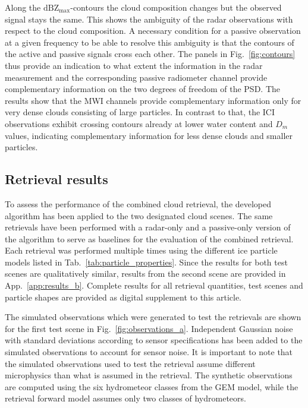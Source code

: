 \documentclass[journal abbreviation, manuscript]{copernicus}
\begin{document}
Along the $\text{dBZ}_\text{max}$-contours the cloud composition changes but the
observed signal stays the same. This shows the ambiguity of the radar
observations with respect to the cloud composition. A necessary condition for a
passive observation at a given frequency to be able to resolve this ambiguity is
that the contours of the active and passive signals cross each other. The panels
in Fig.~\ref{fig:contours} thus provide an indication to what extent the
information in the radar measurement and the corresponding passive radiometer
channel provide complementary information on the two degrees of freedom of the
PSD. The results show that the MWI channels provide complementary information
only for very dense clouds consisting of large particles. In contrast to that,
the ICI observations exhibit crossing contours already at lower water content
and $D_m$ values, indicating complementary information for less dense clouds and
smaller particles.

\subsection{Retrieval results}

To assess the performance of the combined cloud retrieval, the developed
algorithm has been applied to the two designated cloud scenes. The same
retrievals have been performed with a radar-only and a passive-only version of
the algorithm to serve as baselines for the evaluation of the combined
retrieval. Each retrieval was performed multiple times using the different ice
particle models listed in Tab.~\ref{tab:particle_properties}. Since the results
for both test scenes are qualitatively similar, results from the second scene
are provided in App.~\ref{app:results_b}. Complete results for all retrieval
quantities, test scenes and particle shapes are provided as digital supplement
to this article.

The simulated observations which were generated to test the retrievals are shown
for the first test scene in Fig.~\ref{fig:observations_a}. Independent Gaussian
noise with standard deviations according to sensor specifications has been added
to the simulated observations to account for sensor noise. It is important to
note that the simulated observations used to test the retrieval assume different
microphysics than what is assumed in the retrieval. The synthetic observations
are computed using the six hydrometeor classes from the GEM model, while the
retrieval forward model assumes only two classes of hydrometeors.
\end{document}
